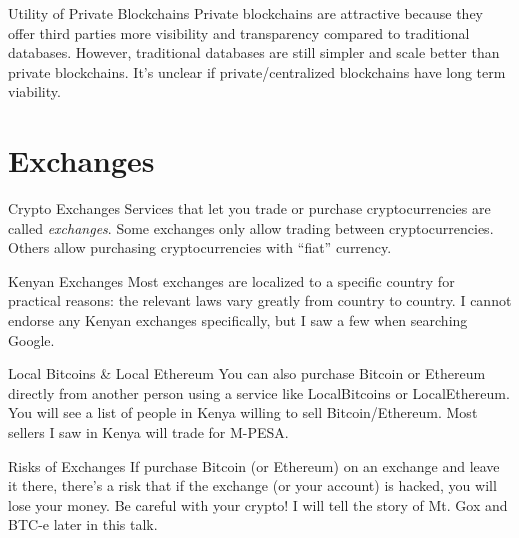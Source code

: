 \documentclass[14pt]{beamer}
\begin{document}
\begin{frame}{Utility of Private Blockchains}
  Private blockchains are attractive because they offer third parties more
  visibility and transparency compared to traditional databases.
  \newline
  \newline
  However, traditional databases are still simpler and scale better than private
  blockchains.
  \newline
  \newline
  It's unclear if private/centralized blockchains have long term viability.
\end{frame}

\section{Exchanges}

\begin{frame}{Crypto Exchanges}
  Services that let you trade or purchase cryptocurrencies are called \emph{exchanges}.
  \newline
  \newline
  Some exchanges only allow trading between cryptocurrencies. Others allow
  purchasing cryptocurrencies with ``fiat'' currency.
\end{frame}

\begin{frame}{Kenyan Exchanges}
  Most exchanges are localized to a specific country for practical reasons: the
  relevant laws vary greatly from country to country.
  \newline
  \newline
  I cannot endorse any Kenyan exchanges specifically, but I saw a few when
  searching Google.
\end{frame}

\begin{frame}{Local Bitcoins \& Local Ethereum}
  You can also purchase Bitcoin or Ethereum directly from another person using a
  service like LocalBitcoins or LocalEthereum.
  \newline
  \newline
  You will see a list of people in Kenya willing to sell Bitcoin/Ethereum. Most
  sellers I saw in Kenya will trade for M-PESA.
\end{frame}

\begin{frame}{Risks of Exchanges}
  If purchase Bitcoin (or Ethereum) on an exchange and leave it there, there's a
  risk that if the exchange (or your account) is hacked, you will lose your
  money.
  \newline
  \newline
  Be careful with your crypto! I will tell the story of Mt. Gox and BTC-e
  later in this talk.
\end{frame}
\end{document}

